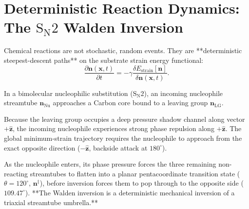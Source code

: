 \documentclass[11pt,a4paper]{article}
\begin{document}
	\section{Deterministic Reaction Dynamics: The \texorpdfstring{$\text{S}_\text{N}2$}{SN2} Walden Inversion}
	\label{sec:sn2_mechanics}
	
	Chemical reactions are not stochastic, random events. They are **deterministic steepest-descent paths** on the substrate strain energy functional:
	\begin{equation}
		\frac{\partial \mathbf{n}(\mathbf{x}, t)}{\partial t} = -\gamma \frac{\delta E_{\text{strain}}[\mathbf{n}]}{\delta \mathbf{n}(\mathbf{x}, t)}.
		\label{eq:steepest_descent_reaction}
	\end{equation}
	
	In a bimolecular nucleophilic substitution ($\text{S}_\text{N}2$), an incoming nucleophile streamtube $\mathbf{n}_{\text{Nu}}$ approaches a Carbon core bound to a leaving group $\mathbf{n}_{\text{LG}}$.
	
	Because the leaving group occupies a deep pressure shadow channel along vector $+\hat{\mathbf{z}}$, the incoming nucleophile experiences strong phase repulsion along $+\hat{\mathbf{z}}$. The global minimum-strain trajectory requires the nucleophile to approach from the exact opposite direction ($-\hat{\mathbf{z}}$, backside attack at $180^\circ$).
	
	As the nucleophile enters, its phase pressure forces the three remaining non-reacting streamtubes to flatten into a planar pentacoordinate transition state ($\theta = 120^\circ$, $\mathbf{n}^\ddagger$), before inversion forces them to pop through to the opposite side ($109.47^\circ$). **The Walden inversion is a deterministic mechanical inversion of a triaxial streamtube umbrella.**
	
\end{document}
